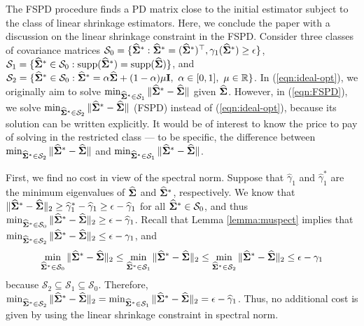 \documentclass[times,sort&compress,3p]{elsarticle}
\newcommand{\MC}{\mathcal}
\begin{document}
The FSPD procedure finds a PD matrix close to the initial estimator subject to the class
of linear shrinkage estimators. Here, we conclude the paper with a discussion on the linear shrinkage
constraint in the FSPD. Consider three classes of covariance matrices
 $\MC{S}_0 = \{ \widehat{\bf \Sigma}^* : \widehat{\bf \Sigma}^* = (\widehat{\bf \Sigma}^*)^{\top},
 \gamma_{1}(\widehat{\bf \Sigma}^*) \geq \epsilon \}$,
$\MC{S}_1 = \{ \widehat{\bf \Sigma}^* \in \MC{S}_0 : {\rm supp}(\widehat{\bf \Sigma}^*) =
{\rm supp}(\widehat{\bf \Sigma}) \}$, and
$\MC{S}_2 = \{ \widehat{\bf \Sigma}^* \in \MC{S}_0 : \widehat{\bf \Sigma}^* = \alpha
\widehat{\bf \Sigma} + (1 - \alpha) \mu {\bf I}, ~ \alpha \in [0,1], ~ \mu \in \mathbb{R} \}$.
In (\ref{eqn:ideal-opt}), we originally aim to solve
 $\min_{\widehat{\bf \Sigma}^* \in \MC{S}_1} \| \widehat{\bf \Sigma}^* -
\widehat{\bf \Sigma} \|$ given $\widehat{\bf \Sigma}$. However, in (\ref{eqn:FSPD}), we solve
 $\min_{\widehat{\bf \Sigma}^* \in \MC{S}_2} \| \widehat{\bf \Sigma}^* - \widehat{\bf \Sigma} \|$ (FSPD)
 instead of (\ref{eqn:ideal-opt}), because its solution can be written explicitly. It would be of interest
 to know the price to pay of solving in the restricted class --- to be specific,
 the difference between $\min_{\widehat{\bf \Sigma}^* \in \MC{S}_2} \|
 \widehat{\bf \Sigma}^* - \widehat{\bf \Sigma} \|$ and $\min_{\widehat{\bf \Sigma}^* \in \MC{S}_1} \|
  \widehat{\bf \Sigma}^* - \widehat{\bf \Sigma} \|$.


 First, we find no cost in view of the spectral norm.
 Suppose that $\widehat{\gamma}_{1}$ and $\widehat{\gamma}_{1}^*$ are
 the minimum eigenvalues of $\widehat{\bf \Sigma}$ and $\widehat{\bf \Sigma}^*$, respectively. We
know that $\| \widehat{\bf \Sigma}^* - \widehat{\bf \Sigma} \|_2 \geq  \widehat{\gamma}_{1}^* -
 \widehat{\gamma}_{1} \geq \epsilon - \widehat{\gamma}_{1}$
for all $\widehat{\bf \Sigma}^* \in \MC{S}_0$, and thus $\min_{\widehat{\bf \Sigma}^* \in \MC{S}_0} \|
\widehat{\bf \Sigma}^* - \widehat{\bf \Sigma} \|_2 \geq \epsilon - \widehat{\gamma}_{1}$. Recall
that Lemma \ref{lemma:muspect} implies that
$\min_{\widehat{\bf \Sigma}^* \in \MC{S}_2}  \|
\widehat{\bf \Sigma}^* - \widehat{\bf \Sigma} \|_2  \leq \epsilon - \gamma_{1}$, and
\begin{equation} \nonumber
\min_{\widehat{\bf \Sigma}^* \in \MC{S}_0}  \|
\widehat{\bf \Sigma}^* - \widehat{\bf \Sigma} \|_2  \leq \min_{\widehat{\bf \Sigma}^* \in \MC{S}_1}   \|
\widehat{\bf \Sigma}^* - \widehat{\bf \Sigma} \|_2 \leq \min_{\widehat{\bf \Sigma}^* \in \MC{S}_2}  \|
\widehat{\bf \Sigma}^* - \widehat{\bf \Sigma} \|_2 \leq \epsilon - \gamma_{1}
\end{equation}
because $\MC{S}_2 \subseteq \MC{S}_1 \subseteq \MC{S}_0$. Therefore,
$\min_{\widehat{\bf \Sigma}^* \in \MC{S}_2} \|
 \widehat{\bf \Sigma}^* - \widehat{\bf \Sigma} \|_2 = \min_{\widehat{\bf \Sigma}^* \in \MC{S}_1} \| \widehat{\bf \Sigma}^*
 - \widehat{\bf \Sigma}\|_2 = \epsilon - \widehat{\gamma}_{1}$. Thus, no additional cost is given by using the linear shrinkage
 constraint in spectral norm.
\end{document}
